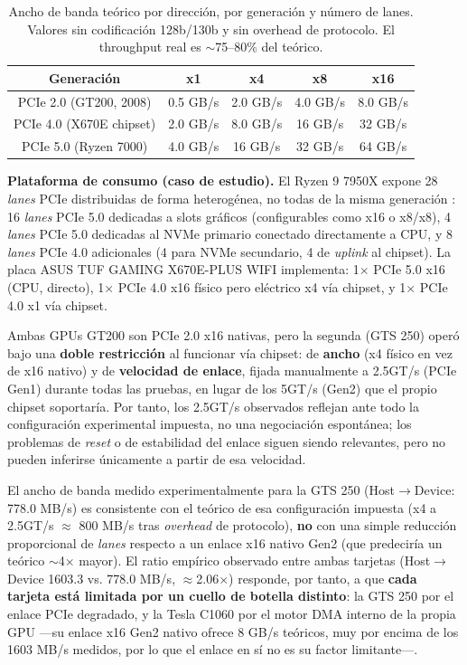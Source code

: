 \begin{table}[htbp]
\centering
\small
\begin{tabular}{|c|c|c|c|c|}
\hline
\textbf{Generación} & \textbf{x1} & \textbf{x4} & \textbf{x8} & \textbf{x16} \\
\hline
PCIe 2.0 (GT200, 2008) & 0.5 GB/s & 2.0 GB/s & 4.0 GB/s & 8.0 GB/s \\
\hline
PCIe 4.0 (X670E chipset) & 2.0 GB/s & 8.0 GB/s & 16 GB/s & 32 GB/s \\
\hline
PCIe 5.0 (Ryzen 7000) & 4.0 GB/s & 16 GB/s & 32 GB/s & 64 GB/s \\
\hline
\end{tabular}
\caption{Ancho de banda teórico por dirección, por generación y número de lanes. Valores sin codificación 128b/130b y sin overhead de protocolo. El throughput real es $\sim$75--80\% del teórico.}
\label{tab:pcie_bw}
\end{table}

\textbf{Plataforma de consumo (caso de estudio).} El Ryzen 9 7950X expone 28 \textit{lanes} PCIe distribuidas de forma heterogénea, no todas de la misma generación \cite{amd7950x}: 16 \textit{lanes} PCIe 5.0 dedicadas a slots gráficos (configurables como x16 o x8/x8), 4 \textit{lanes} PCIe 5.0 dedicadas al NVMe primario conectado directamente a CPU, y 8 \textit{lanes} PCIe 4.0 adicionales (4 para NVMe secundario, 4 de \textit{uplink} al chipset). La placa ASUS TUF GAMING X670E-PLUS WIFI \cite{asusx670e} implementa: 1$\times$ PCIe 5.0 x16 (CPU, directo), 1$\times$ PCIe 4.0 x16 físico pero eléctrico x4 vía chipset, y 1$\times$ PCIe 4.0 x1 vía chipset.

Ambas GPUs GT200 son PCIe 2.0 x16 nativas, pero la segunda (GTS 250) operó bajo una \textbf{doble restricción} al funcionar vía chipset: de \textbf{ancho} (x4 físico en vez de x16 nativo) y de \textbf{velocidad de enlace}, fijada manualmente a 2.5GT/s (PCIe Gen1) durante todas las pruebas, en lugar de los 5GT/s (Gen2) que el propio chipset soportaría. Por tanto, los 2.5GT/s observados reflejan ante todo la configuración experimental impuesta, no una negociación espontánea; los problemas de \textit{reset} o de estabilidad del enlace siguen siendo relevantes, pero no pueden inferirse únicamente a partir de esa velocidad.

El ancho de banda medido experimentalmente para la GTS 250 (Host$\rightarrow$Device: 778.0 MB/s) es consistente con el teórico de esa configuración impuesta (x4 a 2.5GT/s $\approx$ 800 MB/s tras \textit{overhead} de protocolo), \textbf{no} con una simple reducción proporcional de \textit{lanes} respecto a un enlace x16 nativo Gen2 (que predeciría un teórico $\sim$4$\times$ mayor). El ratio empírico observado entre ambas tarjetas (Host$\rightarrow$Device 1603.3 vs. 778.0 MB/s, $\approx$2.06$\times$) responde, por tanto, a que \textbf{cada tarjeta está limitada por un cuello de botella distinto}: la GTS 250 por el enlace PCIe degradado, y la Tesla C1060 por el motor DMA interno de la propia GPU ---su enlace x16 Gen2 nativo ofrece 8 GB/s teóricos, muy por encima de los 1603 MB/s medidos, por lo que el enlace en sí no es su factor limitante---.

